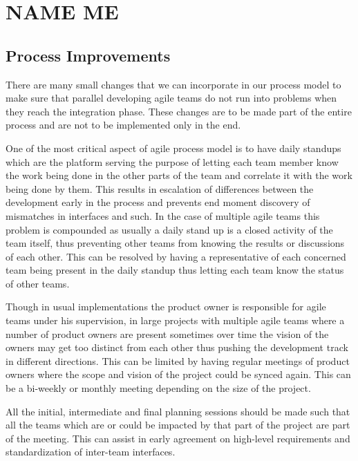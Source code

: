 \section{NAME ME} 

\subsection{Process Improvements} 
\label{sec:proc_impv}
	There are many small changes \cite{collabAcrossAgile_article} that we can incorporate in our process model to make sure that parallel developing agile teams do not run into problems when they reach the integration phase.
	These changes are to be made part of the entire process and are not to be implemented only in the end.

	One of the most critical aspect of agile process model is to have daily standups which are the platform serving the purpose of letting each team member know the work being done in the other parts of the team and correlate it with the work being done by them.
	This results in escalation of differences between the development early in the process and prevents end moment discovery of mismatches in interfaces and such.
	In the case of multiple agile teams this problem is compounded as usually a daily stand up is a closed activity of the team itself, thus preventing other teams from knowing the results or discussions of each other.
	This can be resolved by having a representative of each concerned team being present in the daily standup thus letting each team know the status of other teams.

Though in usual implementations the product owner is responsible for agile teams under his supervision, in large projects with multiple agile teams where a number of product owners are present sometimes over time the vision of the owners may get too distinct from each other thus pushing the development track in different directions.
This can be limited by having regular meetings of product owners where the scope and vision of the project could be synced again. This can be a bi-weekly or monthly meeting depending on the size of the project.

All the initial, intermediate and final planning sessions should be made such that all the teams which are or could be impacted by that part of the project are part of the meeting.
This can assist in early agreement on high-level requirements and standardization of inter-team interfaces.


